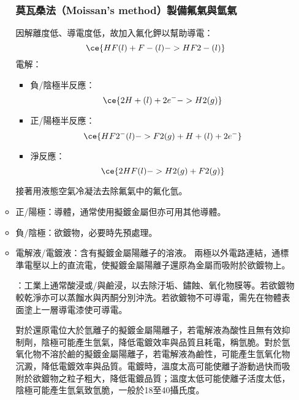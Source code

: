 \documentclass[a4paper,12pt]{report}
\begin{document}
\begin{itemize}
\begin{itemize}
\subsubsection{莫瓦桑法（Moissan's method）製備氟氣與氫氣}
因解離度低、導電度低，故加入氟化鉀以幫助導電：
\[\ce{HF(l) + F-(l) -> HF2-(l)}\]
電解：
\begin{itemize}
\item 負/陰極半反應：
\[\ce{2H+(l) + 2e^- -> H2(g)}\]
\item 正/陽極半反應：
\[\ce{HF2^-(l) -> F2(g) + H+(l) + 2e^-}\]
\item 淨反應：
\[\ce{2HF(l) -> H2(g) + F2(g)}\]
\end{itemize}
接著用液態空氣冷凝法去除氟氣中的氟化氫。
\bit
\item 正/陽極：導體，通常使用擬鍍金屬但亦可用其他導體。
\item 負/陰極：欲鍍物，必要時先預處理。
\item 電解液/電鍍液：含有擬鍍金屬陽離子的溶液。
\eit
兩極以外電路連結，通標準電壓以上的直流電，使擬鍍金屬陽離子還原為金屬而吸附於欲鍍物上。

：工業上通常酸浸或/與鹼浸，以去除汙垢、鏽蝕、氧化物膜等。若欲鍍物較乾淨亦可以蒸餾水與丙酮分別沖洗。若欲鍍物不可導電，需先在物體表面塗上一層導電漆使可導電。

對於還原電位大於氫離子的擬鍍金屬陽離子，若電解液為酸性且無有效抑制劑，陰極可能產生氫氣，降低電鍍效率與品質且耗電，稱氫脆。對於氫氧化物不溶於鹼的擬鍍金屬陽離子，若電解液為鹼性，可能產生氫氧化物沉澱，降低電鍍效率與品質。電鍍時，溫度太高可能使離子游動過快而吸附於欲鍍物之粒子粗大，降低電鍍品質；溫度太低可能使離子活度太低，陰極可能產生氫氣致氫脆，一般於18至40攝氏度。


\end{itemize}
\end{itemize}
\end{document}
